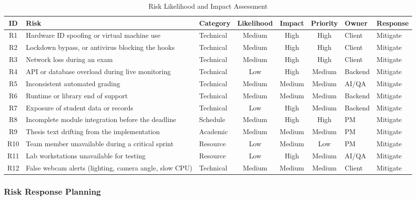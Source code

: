 \begin{table}[!tb]
\centering
\caption{Risk Likelihood and Impact Assessment}
\label{tab:risk_matrix}
{\footnotesize\setlength{\tabcolsep}{3pt}\renewcommand{\arraystretch}{1.2}
\begin{tabularx}{\textwidth}{@{}c>{\raggedright\arraybackslash}Xlcccll@{}}
\hline\hline
\textbf{ID} & \textbf{Risk} & \textbf{Category} & \textbf{Likelihood} & \textbf{Impact} & \textbf{Priority} & \textbf{Owner} & \textbf{Response} \\ \hline
R1 & Hardware ID spoofing or virtual machine use & Technical & Medium & High & High & Client & Mitigate \\
R2 & Lockdown bypass, or antivirus blocking the hooks & Technical & Medium & High & High & Client & Mitigate \\
R3 & Network loss during an exam & Technical & Medium & High & High & Client & Mitigate \\
R4 & API or database overload during live monitoring & Technical & Low & High & Medium & Backend & Mitigate \\
R5 & Inconsistent automated grading & Technical & Medium & Medium & Medium & AI/QA & Mitigate \\
R6 & Runtime or library end of support & Technical & Medium & Medium & Medium & Backend & Mitigate \\
R7 & Exposure of student data or records & Technical & Low & High & Medium & Backend & Mitigate \\
R8 & Incomplete module integration before the deadline & Schedule & Medium & High & High & PM & Mitigate \\
R9 & Thesis text drifting from the implementation & Academic & Medium & Medium & Medium & PM & Mitigate \\
R10 & Team member unavailable during a critical sprint & Resource & Low & Medium & Low & PM & Mitigate \\
R11 & Lab workstations unavailable for testing & Resource & Low & High & Medium & AI/QA & Mitigate \\
R12 & False webcam alerts (lighting, camera angle, slow CPU) & Technical & Medium & Medium & Medium & Client & Mitigate \\ \hline\hline
\end{tabularx}}
\end{table}

\subsubsection{Risk Response Planning}

